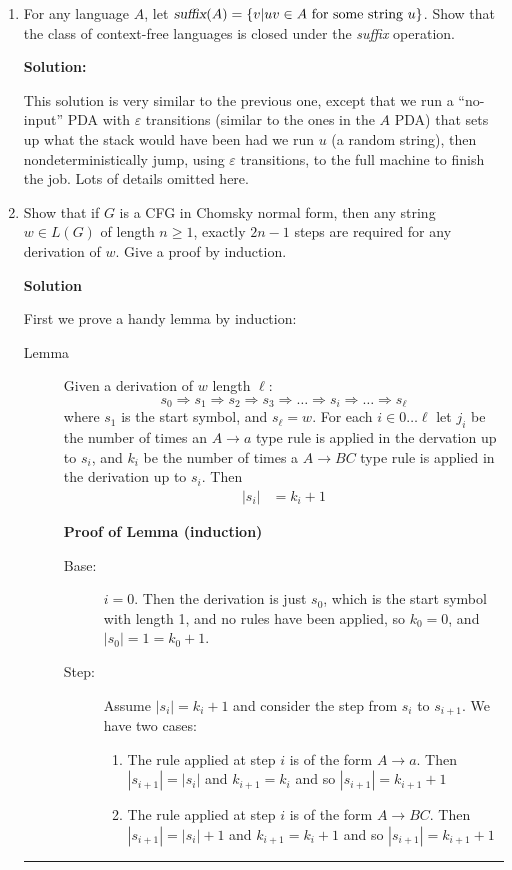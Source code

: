 \documentclass{article}
\begin{document}
\begin{enumerate}
\item For any language $A$, let $\mbox{\sl suffix}(A) =
  \{v|\mbox{$uv\in A$ for some string $u$}\}$.  Show that the class of
  context-free languages is closed under the {\sl suffix} operation.

  {\bf Solution:}

  This solution is very similar to the previous one, except that we
  run a ``no-input'' PDA with $\varepsilon$ transitions (similar to
  the ones in the $A$ PDA) that sets up what the stack would have been
  had we run $u$ (a random string), then nondeterministically jump,
  using $\varepsilon$ transitions, to the full machine to finish the
  job.  Lots of details omitted here.


\item Show that if $G$ is a CFG in Chomsky normal form, then any
  string $w\in L(G)$ of length $n\geq 1$, exactly $2n-1$ steps are
  required for any derivation of $w$.  Give a proof by induction.

{\bf Solution}

  First we prove a handy lemma by induction:

  \begin{description}
  \item[Lemma]
    
    Given a derivation of $w$ length $\ell$:
      \[
      s_0 \Rightarrow  s_1 \Rightarrow s_2 \Rightarrow s_3 \Rightarrow \ldots
      \Rightarrow  s_i \Rightarrow \ldots \Rightarrow s_{\ell}
      \]
      where $s_1$ is the start symbol, and $s_{\ell}=w$.  For each $i\in
      0\ldots \ell$ let $j_i$ be the number of times an $A\rightarrow a$
      type rule is applied in the dervation up to $s_i$, and $k_i$ be the
      number of times a $A\rightarrow BC$ type rule is applied in the
      derivation up to $s_i$.  Then
      \begin{align}
        |s_i| &= k_i+1
      \end{align} 
      
      {\bf Proof of Lemma (induction)}
      \begin{description}
        \item[Base:] $i=0$.  Then the derivation is just $s_0$, which
          is the start symbol with length 1, and no rules have been
          applied, so $k_0=0$, and
          $|s_0| = 1  = k_0+1$.
        \item[Step:] Assume $|s_i| = k_i+1$ and consider the step from
          $s_i$ to $s_{i+1}$.  We have two cases:
          \begin{enumerate}
          \item The rule applied at step $i$ is of the form
            $A\rightarrow a$.  Then $|s_{i+1}| = |s_i|$ and
            $k_{i+1}=k_{i}$ and so $|s_{i+1}| = k_{i+1}+1$
          \item The rule applied at step $i$ is of the form
            $A\rightarrow BC$.  Then $|s_{i+1}|  = |s_{i}|+1$ and
            $k_{i+1}=k_{i}+1$ and so $|s_{i+1}| = k_{i+1}+1$
          \end{enumerate}
      \end{description}
    \end{description}
\hfill
  \rule{1em}{1em}      
    

\end{enumerate}
\end{document}
